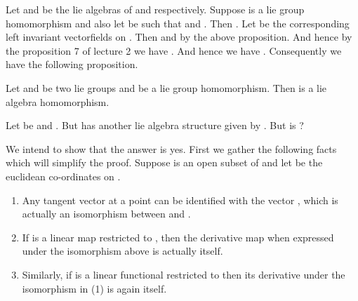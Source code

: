 \documentclass{article}
\newcommand*{\glrg}[1]{GL_{#1 \times #1}(\mathbb{R})}
\newcommand*{\mr}[1]{M_{#1 \times #1}(\mathbb{R})}
\begin{document}
Let  and  be the lie algebras of  and  respectively. Suppose  is a lie group homomorphism and
 also let  be such that  and . Then . Let 
be the corresponding left invariant vectorfields on . Then  and  by the above proposition. And hence by the proposition 7 of lecture 2 we have 
. And hence we have . Consequently we have the following proposition.

\begin{proposition}
    Let  and  be two lie groups and  be a lie group homomorphism. Then  is a lie algebra homomorphism.
\end{proposition}

\begin{question*}
    Let  be \mm{\glrg{n}} and \mm{Lie(G) = \mathfrak{g} = (\mr{n},[,])}. But \mm{\mr(n)}
    has another lie algebra structure given by . But is \mm{[[A,B]] = [A,B]} ?
\end{question*}

We intend to show that the answer is yes. First we gather the following facts which will simplify the proof.
Suppose  is an open subset of \mm{\RR} and let  be the euclidean co-ordinates on . 

\begin{enumerate}
    \item Any tangent vector  at a point  can be identified with the vector , which is actually an isomorphism between  and .
    \item If  is a linear map restricted to , then the derivative map when expressed under the isomorphism above is actually  itself.
    \item Similarly, if  is a linear functional restricted to  then its derivative under the isomorphism in (1) is again itself.
\end{enumerate}
\end{document}
